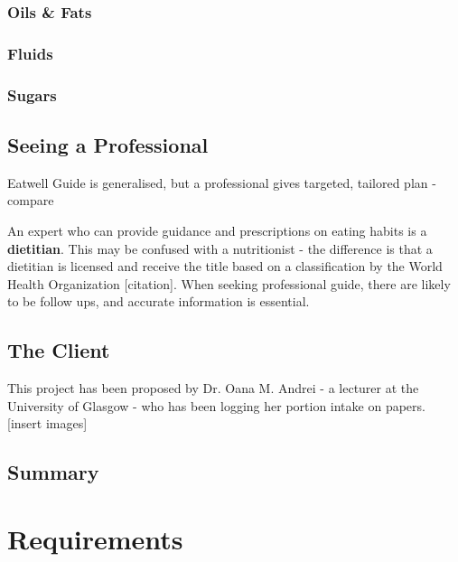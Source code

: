 \documentclass{l4proj}
\begin{document}
\subsection{Oils \& Fats}

\subsection{Fluids}

\subsection{Sugars}

\section{Seeing a Professional}


Eatwell Guide is generalised, but a professional gives targeted, tailored plan - compare

An expert who can provide guidance and prescriptions on eating habits is a \textbf{dietitian}. This may be confused with a nutritionist - the difference is that a dietitian is licensed and receive the title based on a classification by the World Health Organization [citation]. When seeking professional guide, there are likely to be follow ups, and accurate information is essential.

\section{The Client}

This project has been proposed by Dr. Oana M. Andrei - a lecturer at the University of Glasgow - who has been logging her portion intake on papers. [insert images]

\section*{Summary}




\chapter{Requirements}
\end{document}
